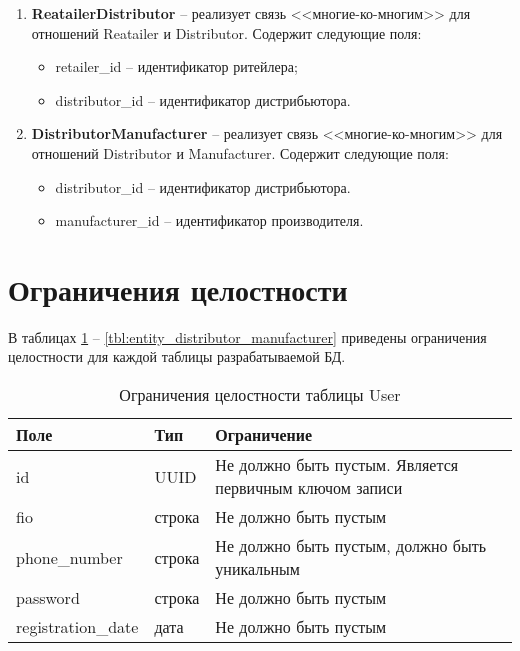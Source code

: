 \begin{enumerate}
	\item \textbf{ReatailerDistributor} -- реализует связь <<многие-ко-многим>> для отношений Reatailer и Distributor. Содержит следующие поля: 
	\begin{itemize}
		\item retailer\_id -- идентификатор ритейлера;
		\item distributor\_id -- идентификатор дистрибьютора.
	\end{itemize}
	
	\item \textbf{DistributorManufacturer} -- реализует связь <<многие-ко-многим>> для отношений Distributor и Manufacturer. Содержит следующие поля: 
	\begin{itemize}
		\item distributor\_id -- идентификатор дистрибьютора.
		\item manufacturer\_id -- идентификатор производителя.
	\end{itemize}
\end{enumerate}

\section{Ограничения целостности}

В таблицах \ref{tbl:entity_user} -- \ref{tbl:entity_distributor_manufacturer} приведены ограничения целостности для каждой таблицы разрабатываемой БД.
 
\clearpage 

\begin{table}[!h]
	\begin{center}
		\begin{threeparttable}
			\caption{Ограничения целостности таблицы User}
			\label{tbl:entity_user}
			\begin{tabular}{|p{4.5cm}|p{2.5cm}|p{8.5cm}|}
				\hline 
				\textbf{Поле} & \textbf{Тип} & \textbf{Ограничение}  \\
				\hline
				id & UUID & Не должно быть пустым. Является первичным ключом записи  \\
				\hline
				fio & строка & Не должно быть пустым  \\
				\hline
				phone\_number & строка & Не должно быть пустым, должно быть уникальным  \\
				\hline
				password & строка & Не должно быть пустым  \\
				\hline
				registration\_date & дата & Не должно быть пустым  \\
				\hline
			\end{tabular}
		\end{threeparttable}			
	\end{center}
\end{table}

